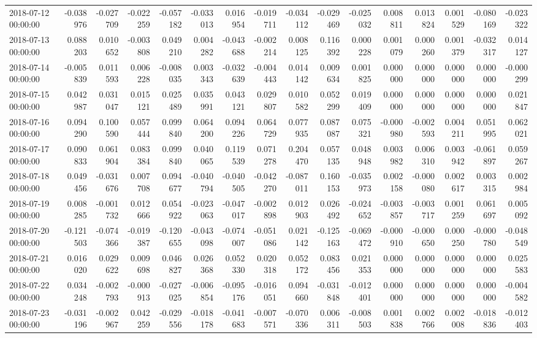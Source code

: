 \begin{tabular}{lrrrrrrrrrrrrrrr}
2018-07-12 00:00:00 & -0.038976 & -0.027709 & -0.022259 & -0.057182 & -0.033013 & 0.016954 & -0.019711 & -0.034112 & -0.029469 & -0.025032 & 0.008811 & 0.013824 & 0.001529 & -0.080169 & -0.023322 \\
2018-07-13 00:00:00 & 0.088203 & 0.010652 & -0.003808 & 0.049210 & 0.004282 & -0.043688 & -0.002214 & 0.008125 & 0.116392 & 0.000228 & 0.001079 & 0.000260 & 0.001379 & -0.032317 & 0.014127 \\
2018-07-14 00:00:00 & -0.005839 & 0.011593 & 0.006228 & -0.008035 & 0.003343 & -0.032639 & -0.004443 & 0.014142 & 0.009634 & 0.001825 & 0.000000 & 0.000000 & 0.000000 & 0.000000 & -0.000299 \\
2018-07-15 00:00:00 & 0.042987 & 0.031047 & 0.015121 & 0.025489 & 0.035991 & 0.043121 & 0.029807 & 0.010582 & 0.052299 & 0.019409 & 0.000000 & 0.000000 & 0.000000 & 0.000000 & 0.021847 \\
2018-07-16 00:00:00 & 0.094290 & 0.100590 & 0.057444 & 0.099840 & 0.064200 & 0.094226 & 0.064729 & 0.077935 & 0.087087 & 0.075321 & -0.000980 & -0.002593 & 0.004211 & 0.051995 & 0.062021 \\
2018-07-17 00:00:00 & 0.090833 & 0.061904 & 0.083384 & 0.099840 & 0.040065 & 0.119539 & 0.071278 & 0.204470 & 0.057135 & 0.048948 & 0.003982 & 0.006310 & 0.003942 & -0.061897 & 0.059267 \\
2018-07-18 00:00:00 & 0.049456 & -0.031676 & 0.007708 & 0.094677 & -0.040794 & -0.040505 & -0.042270 & -0.087011 & 0.160153 & -0.035973 & 0.002158 & -0.000080 & 0.002617 & 0.003315 & 0.002984 \\
2018-07-19 00:00:00 & 0.008285 & -0.001732 & 0.012666 & 0.054922 & -0.023063 & -0.047017 & -0.002898 & 0.012903 & 0.026492 & -0.024652 & -0.003857 & -0.003717 & 0.001259 & 0.061697 & 0.005092 \\
2018-07-20 00:00:00 & -0.121503 & -0.074366 & -0.019387 & -0.120655 & -0.043098 & -0.074007 & -0.051086 & 0.021142 & -0.125163 & -0.069472 & -0.000910 & -0.000650 & 0.000250 & -0.000780 & -0.048549 \\
2018-07-21 00:00:00 & 0.016020 & 0.029622 & 0.009698 & 0.046827 & 0.026368 & 0.052330 & 0.020318 & 0.052172 & 0.083456 & 0.021353 & 0.000000 & 0.000000 & 0.000000 & 0.000000 & 0.025583 \\
2018-07-22 00:00:00 & 0.034248 & -0.002793 & -0.000913 & -0.027025 & -0.006854 & -0.095176 & -0.016051 & 0.094660 & -0.031848 & -0.012401 & 0.000000 & 0.000000 & 0.000000 & 0.000000 & -0.004582 \\
2018-07-23 00:00:00 & -0.031196 & -0.002967 & 0.042259 & -0.029556 & -0.018178 & -0.041683 & -0.007571 & -0.070336 & 0.006311 & -0.008503 & 0.001838 & 0.002766 & 0.002008 & -0.018836 & -0.012403 \\

\end{tabular}
